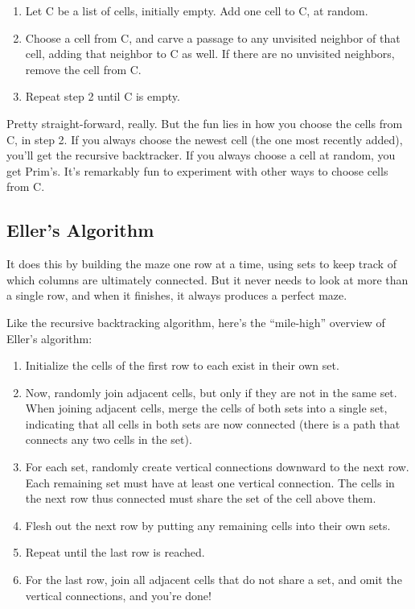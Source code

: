 \documentclass{article}
\begin{document}
\begin{enumerate}
    \item Let C be a list of cells, initially empty. Add one cell to C, at random.
    \item Choose a cell from C, and carve a passage to any unvisited neighbor of that cell, adding that neighbor to C as well. If there are no unvisited neighbors, remove the cell from C.
    \item Repeat step 2 until C is empty.
\end{enumerate}

Pretty straight-forward, really. But the fun lies in how you choose the cells from C, in step 2. If you always choose the newest cell (the one most recently added), you'll get the recursive backtracker. If you always choose a cell at random, you get Prim's. It's remarkably fun to experiment with other ways to choose cells from C.

\subsection{Eller's Algorithm}
It does this by building the maze one row at a time, using sets to keep track of which columns are ultimately connected. But it never needs to look at more than a single row, and when it finishes, it always produces a perfect maze.

Like the recursive backtracking algorithm, here's the “mile-high” overview of Eller's algorithm:
\begin{enumerate}
    \item Initialize the cells of the first row to each exist in their own set.
    \item Now, randomly join adjacent cells, but only if they are not in the same set. When joining adjacent cells, merge the cells of both sets into a single set, indicating that all cells in both sets are now connected (there is a path that connects any two cells in the set).
    \item For each set, randomly create vertical connections downward to the next row. Each remaining set must have at least one vertical connection. The cells in the next row thus connected must share the set of the cell above them.
    \item Flesh out the next row by putting any remaining cells into their own sets.
    \item Repeat until the last row is reached.
    \item For the last row, join all adjacent cells that do not share a set, and omit the vertical connections, and you're done!
\end{enumerate}
\end{document}
